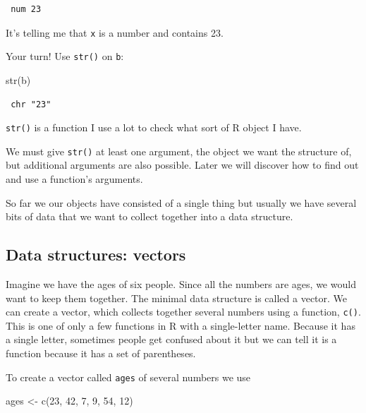 \documentclass[
  letterpaper,
  DIV=11,
  numbers=noendperiod]{scrreprt}
\newenvironment{Shaded}{\begin{snugshade}}{\end{snugshade}}
\newcommand{\DecValTok}[1]{\textcolor[rgb]{0.68,0.00,0.00}{#1}}
\newcommand{\FunctionTok}[1]{\textcolor[rgb]{0.28,0.35,0.67}{#1}}
\newcommand{\NormalTok}[1]{\textcolor[rgb]{0.00,0.23,0.31}{#1}}
\newcommand{\OtherTok}[1]{\textcolor[rgb]{0.00,0.23,0.31}{#1}}
\begin{document}
\begin{verbatim}
 num 23
\end{verbatim}

It's telling me that \texttt{x} is a number and contains 23.

Your turn! Use \texttt{str()} on \texttt{b}:

\begin{Shaded}
\begin{Highlighting}[]
\FunctionTok{str}\NormalTok{(b)}
\end{Highlighting}
\end{Shaded}

\begin{verbatim}
 chr "23"
\end{verbatim}

\texttt{str()} is a function I use a lot to check what sort of R object
I have.

We must give \texttt{str()} at least one argument, the object we want
the structure of, but additional arguments are also possible. Later we
will discover how to find out and use a function's arguments.

So far we our objects have consisted of a single thing but usually we
have several bits of data that we want to collect together into a data
structure.

\hypertarget{data-structures-vectors}{%
\subsection{Data structures: vectors}\label{data-structures-vectors}}

Imagine we have the ages of six people. Since all the numbers are ages,
we would want to keep them together. The minimal data structure is
called a vector. We can create a vector, which collects together several
numbers using a function, \texttt{c()}. This is one of only a few
functions in R with a single-letter name. Because it has a single
letter, sometimes people get confused about it but we can tell it is a
function because it has a set of parentheses.

To create a vector called \texttt{ages} of several numbers we use

\begin{Shaded}
\begin{Highlighting}[]
\NormalTok{ages }\OtherTok{\textless{}{-}} \FunctionTok{c}\NormalTok{(}\DecValTok{23}\NormalTok{, }\DecValTok{42}\NormalTok{, }\DecValTok{7}\NormalTok{, }\DecValTok{9}\NormalTok{, }\DecValTok{54}\NormalTok{, }\DecValTok{12}\NormalTok{)}
\end{Highlighting}
\end{Shaded}
\end{document}
